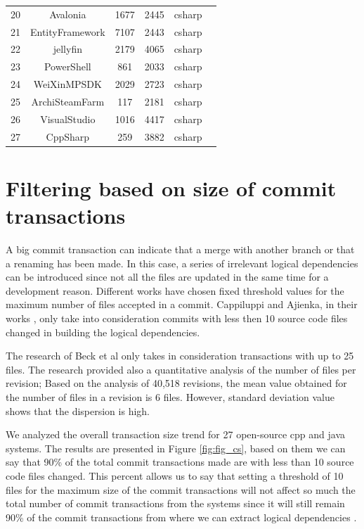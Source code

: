 \documentclass[12pt]{mitthesis}
\begin{document}
\begin{table}[H]
\begin{tabular}{|c|c|c|c|c|c|}
20	&	Avalonia	&	1677	&	2445	&	csharp	\\
21	&	EntityFramework	&	7107	&	2443	&	csharp	\\
22	&	jellyfin	&	2179	&	4065	&	csharp	\\
23	&	PowerShell	&	861	&	2033	&	csharp	\\
24	&	WeiXinMPSDK	&	2029	&	2723	&	csharp	\\
25	&	ArchiSteamFarm	&	117	&	2181	&	csharp	\\
26	&	VisualStudio	&	1016	&	4417	&	csharp	\\
27	&	CppSharp	&	259	&	3882	&	csharp	\\
\hline
\end{tabular}
\end{table}


\section{Filtering based on size of commit transactions}
\label{sec:filtercommit}
A big commit transaction can indicate that a merge with another branch or that a renaming has been made.
In this case, a series of irrelevant logical dependencies can be introduced since not all the files are updated in the same time for a development reason. Different works have chosen fixed threshold values for the maximum number of files accepted in a commit. Cappiluppi and Ajienka, in their works \cite{DBLP:journals/jss/AjienkaC17}, \cite{DBLP:journals/ese/AjienkaCC18} only take into consideration commits with less then 10 source code files changed in building the logical dependencies.

The research of Beck et al \cite{Beck:2011:CMC:2025113.2025162} only takes in consideration transactions with up to 25 files. The research \cite{Oliva:2011:ISL:2067853.2068086} provided also a quantitative analysis of the number of files per revision; Based on the analysis of 40,518 revisions, the mean value obtained for the number of files in a revision is 6 files. However, standard deviation value shows that the dispersion is high. 

We analyzed the overall transaction size trend for 27 open-source cpp and java systems. The results are presented in Figure \ref{fig:fig_cs}, based on them we can say that 90\% of the total commit transactions made are with less than 10 source code files changed. This percent allows us to say that setting a threshold of 10 files for the maximum size of the commit transactions will not affect so much the total number of commit transactions from the systems since it will still remain 90\% of the commit transactions from where we can extract logical dependencies \cite{DepSACI}.
\end{document}
